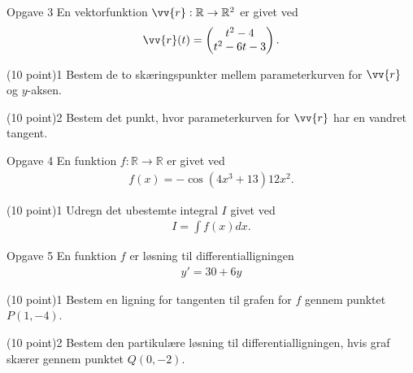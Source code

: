 \documentclass[12pt,x11names,a4paper]{article}
\begin{document}

\newpage

\begin{opgavetekst}{Opgave 3}
	En vektorfunktion $\vv{r}:\mathbb{R}\to \mathbb{R}^2$ er givet ved
	\begin{align*}
		\vv{r}(t) = 
		\begin{pmatrix}
			t^2-4 \\
			t^2-6t-3
		\end{pmatrix}.
	\end{align*}
\end{opgavetekst}
\begin{delopgave}{(10 point)}{1}
	Bestem de to skæringspunkter mellem parameterkurven for $\vv{r}$ og $y$-aksen.
\end{delopgave}
\begin{delopgave}{(10 point)}{2}
	Bestem det punkt, hvor parameterkurven for $\vv{r}$ har en vandret tangent. 
\end{delopgave}


\begin{opgavetekst}{Opgave 4}
	En funktion $f:\mathbb{R} \to \mathbb{R}$ er givet ved
	\begin{align*}
		f(x) = -\cos(4x^3+13)12x^2.
	\end{align*}
\end{opgavetekst}
\begin{delopgave}{(10 point)}{1}
	Udregn det ubestemte integral $I$ givet ved
	\begin{align*}
		I = \int f(x) dx.
	\end{align*}
\end{delopgave}



\begin{opgavetekst}{Opgave 5}
	En funktion $f$ er løsning til differentialligningen
	\begin{align*}
		y' = 30 + 6y
	\end{align*}
\end{opgavetekst}
\begin{delopgave}{(10 point)}{1}
	Bestem en ligning for tangenten til grafen for $f$ gennem punktet $P(1,-4)$.
\end{delopgave}
\begin{delopgave}{(10 point)}{2}
	Bestem den partikulære løsning til differentialligningen, hvis graf skærer gennem punktet $Q(0,-2)$.
\end{delopgave}

\end{document}

